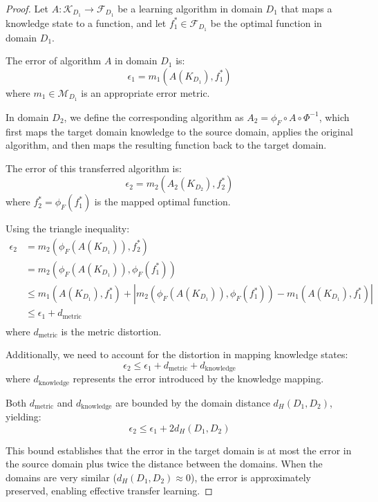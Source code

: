\begin{proof}
Let $A: \mathcal{K}_{D_1} \to \mathcal{F}_{D_1}$ be a learning algorithm in domain $D_1$ that maps a knowledge state to a function, and let $f_1^* \in \mathcal{F}_{D_1}$ be the optimal function in domain $D_1$.

The error of algorithm $A$ in domain $D_1$ is:
\begin{equation}
\epsilon_1 = m_1(A(K_{D_1}), f_1^*)
\end{equation}
where $m_1 \in \mathcal{M}_{D_1}$ is an appropriate error metric.

In domain $D_2$, we define the corresponding algorithm as $A_2 = \phi_F \circ A \circ \Phi^{-1}$, which first maps the target domain knowledge to the source domain, applies the original algorithm, and then maps the resulting function back to the target domain.

The error of this transferred algorithm is:
\begin{equation}
\epsilon_2 = m_2(A_2(K_{D_2}), f_2^*)
\end{equation}
where $f_2^* = \phi_F(f_1^*)$ is the mapped optimal function.

Using the triangle inequality:
\begin{align}
\epsilon_2 &= m_2(\phi_F(A(K_{D_1})), f_2^*) \\
&= m_2(\phi_F(A(K_{D_1})), \phi_F(f_1^*)) \\
&\leq m_1(A(K_{D_1}), f_1^*) + |m_2(\phi_F(A(K_{D_1})), \phi_F(f_1^*)) - m_1(A(K_{D_1}), f_1^*)| \\
&\leq \epsilon_1 + d_{\text{metric}} \\
\end{align}
where $d_{\text{metric}}$ is the metric distortion.

Additionally, we need to account for the distortion in mapping knowledge states:
\begin{equation}
\epsilon_2 \leq \epsilon_1 + d_{\text{metric}} + d_{\text{knowledge}}
\end{equation}
where $d_{\text{knowledge}}$ represents the error introduced by the knowledge mapping.

Both $d_{\text{metric}}$ and $d_{\text{knowledge}}$ are bounded by the domain distance $d_H(D_1, D_2)$, yielding:
\begin{equation}
\epsilon_2 \leq \epsilon_1 + 2d_H(D_1, D_2)
\end{equation}

This bound establishes that the error in the target domain is at most the error in the source domain plus twice the distance between the domains. When the domains are very similar ($d_H(D_1, D_2) \approx 0$), the error is approximately preserved, enabling effective transfer learning.
\end{proof}

